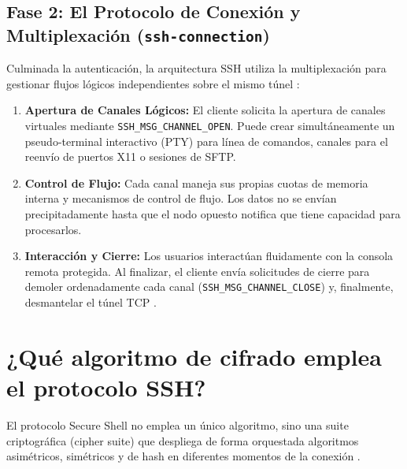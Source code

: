 \documentclass[a4paper,12pt]{article}
\begin{document}
\subsection*{Fase 2: El Protocolo de Conexión y Multiplexación (\texttt{ssh-connection})}
Culminada la autenticación, la arquitectura SSH utiliza la multiplexación para gestionar flujos lógicos independientes sobre el mismo túnel \cite{rfc4254_ietf}:
\begin{enumerate}
    \item \textbf{Apertura de Canales Lógicos:} El cliente solicita la apertura de canales virtuales mediante \texttt{SSH\_MSG\_CHANNEL\_OPEN}. Puede crear simultáneamente un pseudo-terminal interactivo (PTY) para línea de comandos, canales para el reenvío de puertos X11 o sesiones de SFTP.
    \item \textbf{Control de Flujo:} Cada canal maneja sus propias cuotas de memoria interna y mecanismos de control de flujo. Los datos no se envían precipitadamente hasta que el nodo opuesto notifica que tiene capacidad para procesarlos.
    \item \textbf{Interacción y Cierre:} Los usuarios interactúan fluidamente con la consola remota protegida. Al finalizar, el cliente envía solicitudes de cierre para demoler ordenadamente cada canal (\texttt{SSH\_MSG\_CHANNEL\_CLOSE}) y, finalmente, desmantelar el túnel TCP \cite{rfc4254_ietf}.
\end{enumerate}


\section{¿Qué algoritmo de cifrado emplea el protocolo SSH?}

El protocolo Secure Shell no emplea un único algoritmo, sino una suite criptográfica (cipher suite) que despliega de forma orquestada algoritmos asimétricos, simétricos y de hash en diferentes momentos de la conexión \cite{redeszone_cripto}.
\end{document}
